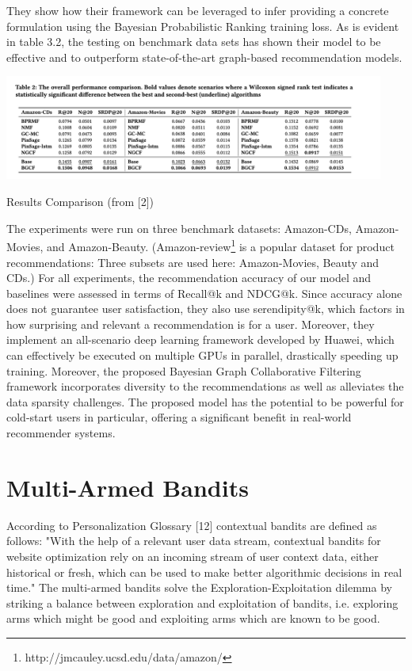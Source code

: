They show how their framework can be leveraged to infer providing a concrete formulation using the Bayesian Probabilistic Ranking training loss. As is evident in table 3.2, the testing on benchmark data sets has shown their model to be effective and to outperform state-of-the-art graph-based recommendation models. 

\begin{table}[hh!]
    \centering
    \includegraphics[width=125mm]{BGCF_results_comparison.png}
    \caption{Results Comparison (from [2])
    \label{overflow}}
\end{table}

The experiments were run on three benchmark datasets: Amazon-CDs, Amazon-Movies, and Amazon-Beauty. (Amazon-review\footnote{ http://jmcauley.ucsd.edu/data/amazon/} is a popular dataset for product recommendations: Three subsets are used here: Amazon-Movies, Beauty and CDs.) For all experiments, the recommendation accuracy of our model and baselines were assessed in terms of Recall@k and NDCG@k. Since accuracy alone does not guarantee user satisfaction, they also use serendipity@k, which factors in how surprising and relevant a recommendation is for a user. Moreover, they implement an all-scenario deep learning framework developed by Huawei, which can effectively be executed on multiple GPUs in parallel, drastically speeding up training.  Moreover, the proposed Bayesian Graph Collaborative Filtering framework incorporates diversity to the recommendations as well as alleviates the data sparsity challenges. The proposed model has the potential to be powerful for cold-start users in particular, offering a significant benefit in real-world recommender systems. 

\chapter{Multi-Armed Bandits}
According to Personalization Glossary [12] contextual bandits are defined as follows: "With the help of a relevant user data stream, contextual bandits for website optimization rely on an incoming stream of user context data, either historical or fresh, which can be used to make better algorithmic decisions in real time."
The multi-armed bandits solve the Exploration-Exploitation dilemma by striking a balance between exploration and exploitation of bandits, i.e. exploring arms which might be good and exploiting arms which are known to be good.

